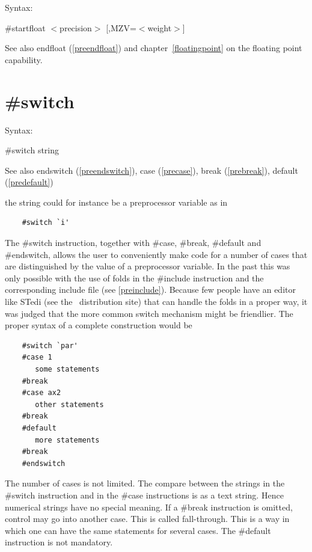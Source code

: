 \noindent Syntax:

\#startfloat $<$precision$>$ [,MZV=$<$weight$>$]

\noindent See also endfloat (\ref{preendfloat}) and chapter~\ref{floatingpoint} on the floating point capability.
 

\section{\#switch}
\label{preswitch}

\noindent Syntax:

\#switch string
 
\noindent See also endswitch (\ref{preendswitch}),
        case (\ref{precase}),
        break (\ref{prebreak}),
        default (\ref{predefault})

\noindent the string could for instance be a preprocessor 
variable as in
\begin{verbatim}
    #switch `i'
\end{verbatim}
The \#switch instruction, together with 
\#case, \#break, \#default 
and \#endswitch, allows the user to conveniently make 
code for a number of cases that are distinguished by the value of a 
preprocessor variable. In the past this was only possible with the use of 
folds in the \#include instruction and the 
corresponding include file (see \ref{preinclude}). 
Because few people have an editor like STedi (see the \FORM\ distribution 
site) that can handle the folds in a proper way, it was judged that the 
more common switch mechanism might be friendlier. The proper syntax of a 
complete construction would be
\begin{verbatim}
    #switch `par'
    #case 1
       some statements
    #break
    #case ax2
       other statements
    #break
    #default
       more statements
    #break
    #endswitch
\end{verbatim}
The number of cases is not limited. The compare between the strings in the 
\#switch instruction and in the \#case instructions is as a text string. 
Hence numerical strings have no special meaning. If a \#break instruction 
is omitted, control may go into another case. This is called 
fall-through. 
This is a way in which one can have the same statements for several cases. 
The \#default instruction is not mandatory.

